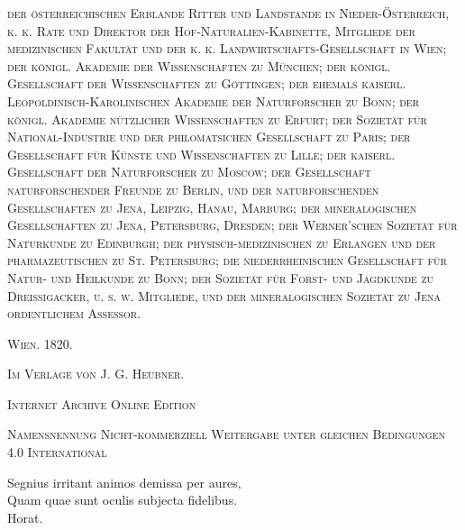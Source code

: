 \documentclass[a4paper, 11pt, oneside, german]{article}
\begin{document}
\begin{titlepage}
    {\scshape\footnotesize der österreichischen Erblande Ritter und Landstande in Nieder-Österreich, k. k. Rate und Direktor der Hof-Naturalien-Kabinette, Mitgliede der medizinischen Fakultät und der k. k. Landwirtschafts-Gesellschaft in Wien; der königl. Akademie der Wissenschaften zu München; der königl. Gesellschaft der Wissenschaften zu Göttingen; der ehemals kaiserl. Leopoldinisch-Karolinischen Akademie der Naturforscher zu Bonn; der königl. Akademie nützlicher Wissenschaften zu Erfurt; der Sozietät für National-Industrie und der philomatsichen Gesellschaft zu Paris; der Gesellschaft für Künste und Wissenschaften zu Lille; der kaiserl. Gesellschaft der Naturforscher zu Moscow; der Gesellschaft naturforschender Freunde zu Berlin, und der naturforschenden Gesellschaften zu Jena, Leipzig, Hanau, Marburg; der mineralogischen Gesellschaften zu Jena, Petersburg, Dresden; der Werner'schen Sozietät für Naturkunde zu Edinburgh; der physisch-medizinischen zu Erlangen und der pharmazeutischen zu St. Petersburg; die niederrheinischen Gesellschaft für Natur- und Heilkunde zu Bonn; der Sozietät für Forst- und Jagdkunde zu Dreissigacker, u. s. w. Mitgliede, und der mineralogischen Sozietät zu Jena ordentlichem Assessor.} %
    
    \vspace*{\fill}

	\vspace{1\baselineskip}

	{\small\scshape Wien. 1820.}
	
	{\small\scshape{Im Verlage von J. G. Heubner.}}
	
	\vspace{0.5\baselineskip} %

    \scshape Internet Archive Online Edition  %
	
	{\scshape\small Namensnennung Nicht-kommerziell Weitergabe unter gleichen Bedingungen 4.0 International} %
\end{titlepage}
\setlength{\parskip}{1mm plus1mm minus1mm}
\clearpage
\tableofcontents
\clearpage
\vspace*{\fill}
\begin{center}
Segnius irritant animos demissa per aures,\\
Quam quae sunt oculis subjecta fidelibus.\\
Horat.
\end{center}
\vspace*{\fill}
\clearpage
\end{document}
